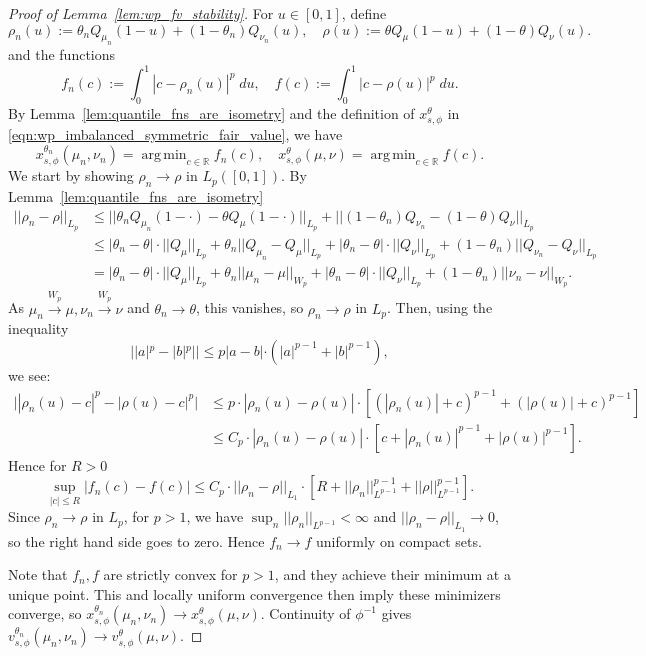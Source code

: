 \documentclass[11pt]{article}
\theoremstyle{plain}
\theoremstyle{definition}
\numberwithin{equation}{section}
\DeclareMathOperator*{\argmin}{arg\,min}
\begin{document}
\begin{proof}[Proof of Lemma~\ref{lem:wp_fv_stability}]
     For $u \in [0,1]$, define
    \[\rho_n(u) := \theta_n Q_{\mu_n}(1-u) + (1-\theta_n) Q_{\nu_n}(u), \quad \rho(u) := \theta Q_{\mu}(1-u) + (1-\theta) Q_{\nu}(u).\]
    \noindent and the functions
    \[f_n(c) := \int_0^1 |c - \rho_n(u)|^p \; du, \quad f(c) := \int_0^1 |c - \rho(u)|^p \; du.\]
    \noindent By Lemma~\ref{lem:quantile_fns_are_isometry} and the definition of $x_{s,\phi}^\theta$ in \eqref{eqn:wp_imbalanced_symmetric_fair_value}, we have
    \[x_{s,\phi}^{\theta_n}(\mu_n, \nu_n) = \argmin_{c \in \mathbb R} f_n(c), \quad x_{s,\phi}^{\theta}(\mu, \nu) = \argmin_{c \in \mathbb R} f(c).\]
    \noindent We start by showing $\rho_n \to \rho$
    in $L_p([0,1])$. By Lemma~\ref{lem:quantile_fns_are_isometry}
    \begin{align*}
        ||\rho_n - \rho||_{L_p} & \leq ||\theta_n Q_{\mu_n}(1-\cdot) - \theta Q_{\mu}(1-\cdot)||_{L_p} + ||(1-\theta_n) Q_{\nu_n} - (1-\theta) Q_{\nu}||_{L_p} \\[5pt]
        & \leq |\theta_n - \theta| \cdot ||Q_{\mu}||_{L_p} + \theta_n || Q_{\mu_n} - Q_{\mu} ||_{L_p} + |\theta_n - \theta| \cdot ||Q_{\nu}||_{L_p} + (1-\theta_n) || Q_{\nu_n} - Q_{\nu} ||_{L_p} \\[5pt]
        & = |\theta_n - \theta| \cdot ||Q_{\mu}||_{L_p} + \theta_n ||\mu_n - \mu||_{W_p} + |\theta_n - \theta| \cdot ||Q_{\nu}||_{L_p} + (1-\theta_n) ||\nu_n - \nu||_{W_p}.
    \end{align*}
    \noindent As $\mu_n \xrightarrow{W_p} \mu, \nu_n \xrightarrow{W_p} \nu$ and $\theta_n \to \theta$,
    this vanishes, so $\rho_n \to \rho$ in $L_p$. Then, using the inequality
    \[||a|^p - |b|^p|| \leq p |a-b| \cdot (|a|^{p-1} + |b|^{p-1}),\]
    \noindent we see:
    \begin{align*}
        \Big| |\rho_n(u) - c|^p - |\rho(u) - c|^p\Big| & \leq p \cdot |\rho_n(u) - \rho(u)| \cdot \left[(|\rho_n(u)| +c)^{p-1} + (|\rho(u)| + c)^{p-1}\right]\\
        & \leq C_p \cdot |\rho_n(u) - \rho(u)| \cdot \left[c + |\rho_n(u)|^{p-1} + |\rho(u)|^{p-1}\right].
    \end{align*}
    \noindent Hence for $R > 0$
    \[\sup_{|c| \leq R} |f_n(c) - f(c)| \leq C_p \cdot ||\rho_n - \rho||_{L_1} \cdot \left[R + ||\rho_n||_{L^{p-1}}^{p-1} + ||\rho||_{L^{p-1}}^{p-1}\right].\]
    \noindent Since $\rho_n \to \rho$ in $L_p$, for $p > 1$, we have $\sup_n ||\rho_n||_{L^{p-1}} < \infty$ and $||\rho_n - \rho||_{L_1} \to 0$, so the right hand
    side goes to zero. Hence $f_n \to f$ uniformly on compact sets.

    Note that $f_n, f$ are strictly convex for $p > 1$, and they achieve their minimum at a
    unique point. This and locally uniform convergence then imply these minimizers converge,
    so $x_{s,\phi}^{\theta_n}(\mu_n,\nu_n)\to x_{s,\phi}^{\theta}(\mu,\nu)$. Continuity of $\phi^{-1}$ gives $v_{s,\phi}^{\theta_n}(\mu_n,\nu_n)\to v_{s,\phi}^{\theta}(\mu,\nu)$.
\end{proof}

\clearpage
\printbibliography[title={References}]
\end{document}
